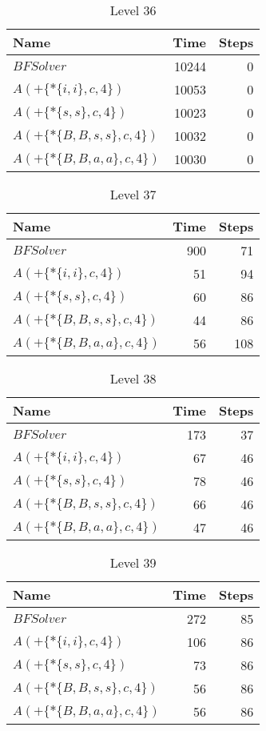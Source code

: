 \begin{table} \centering \begin{tabular}{lrr}\toprule \textbf{ Name }
    & \textbf{ Time } & \textbf{ Steps }\\\midrule
    $BFSolver$ & 10244 & 0 \\
    $A(+\{*\{i,i\},c,4\})$ & 10053 & 0 \\
    $A(+\{*\{s,s\},c,4\})$ & 10023 & 0 \\
    $A(+\{*\{B,B,s,s\},c,4\})$ & 10032 & 0 \\
    $A(+\{*\{B,B,a,a\},c,4\})$ & 10030 & 0 \\
    \bottomrule \end{tabular} \caption{Level 36}
  \label{tab:level_36} \end{table}

\begin{table} \centering \begin{tabular}{lrr}\toprule \textbf{ Name }
    & \textbf{ Time } & \textbf{ Steps }\\\midrule
    $BFSolver$ & 900 & 71 \\
    $A(+\{*\{i,i\},c,4\})$ & 51 & 94 \\
    $A(+\{*\{s,s\},c,4\})$ & 60 & 86 \\
    $A(+\{*\{B,B,s,s\},c,4\})$ & 44 & 86 \\
    $A(+\{*\{B,B,a,a\},c,4\})$ & 56 & 108 \\
    \bottomrule \end{tabular} \caption{Level 37}
  \label{tab:level_37} \end{table}

\begin{table} \centering \begin{tabular}{lrr}\toprule \textbf{ Name }
    & \textbf{ Time } & \textbf{ Steps }\\\midrule
    $BFSolver$ & 173 & 37 \\
    $A(+\{*\{i,i\},c,4\})$ & 67 & 46 \\
    $A(+\{*\{s,s\},c,4\})$ & 78 & 46 \\
    $A(+\{*\{B,B,s,s\},c,4\})$ & 66 & 46 \\
    $A(+\{*\{B,B,a,a\},c,4\})$ & 47 & 46 \\
    \bottomrule \end{tabular} \caption{Level 38}
  \label{tab:level_38} \end{table}

\begin{table} \centering \begin{tabular}{lrr}\toprule \textbf{ Name }
    & \textbf{ Time } & \textbf{ Steps }\\\midrule
    $BFSolver$ & 272 & 85 \\
    $A(+\{*\{i,i\},c,4\})$ & 106 & 86 \\
    $A(+\{*\{s,s\},c,4\})$ & 73 & 86 \\
    $A(+\{*\{B,B,s,s\},c,4\})$ & 56 & 86 \\
    $A(+\{*\{B,B,a,a\},c,4\})$ & 56 & 86 \\
    \bottomrule \end{tabular} \caption{Level 39}
  \label{tab:level_39} \end{table}

